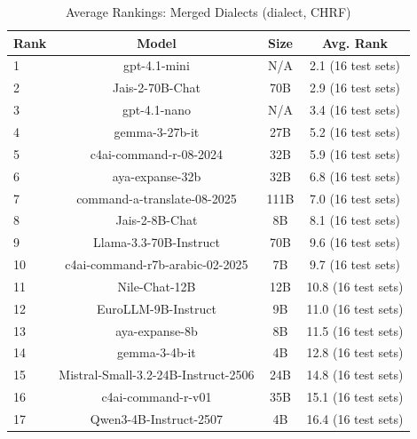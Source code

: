 \begin{table}[htbp]
\centering
\caption{Average Rankings: Merged Dialects (dialect, CHRF)}
\label{tab:avg_rankings_chrf_dialect}
\begin{tabular}{l@{\hspace{3pt}}c@{\hspace{3pt}}c@{\hspace{3pt}}c}
\toprule
Rank & Model & Size & Avg. Rank \\
\midrule
1 & gpt-4.1-mini & N/A & 2.1 (16 test sets) \\
2 & Jais-2-70B-Chat & 70B & 2.9 (16 test sets) \\
3 & gpt-4.1-nano & N/A & 3.4 (16 test sets) \\
4 & gemma-3-27b-it & 27B & 5.2 (16 test sets) \\
5 & c4ai-command-r-08-2024 & 32B & 5.9 (16 test sets) \\
6 & aya-expanse-32b & 32B & 6.8 (16 test sets) \\
7 & command-a-translate-08-2025 & 111B & 7.0 (16 test sets) \\
8 & Jais-2-8B-Chat & 8B & 8.1 (16 test sets) \\
9 & Llama-3.3-70B-Instruct & 70B & 9.6 (16 test sets) \\
10 & c4ai-command-r7b-arabic-02-2025 & 7B & 9.7 (16 test sets) \\
11 & Nile-Chat-12B & 12B & 10.8 (16 test sets) \\
12 & EuroLLM-9B-Instruct & 9B & 11.0 (16 test sets) \\
13 & aya-expanse-8b & 8B & 11.5 (16 test sets) \\
14 & gemma-3-4b-it & 4B & 12.8 (16 test sets) \\
15 & Mistral-Small-3.2-24B-Instruct-2506 & 24B & 14.8 (16 test sets) \\
16 & c4ai-command-r-v01 & 35B & 15.1 (16 test sets) \\
17 & Qwen3-4B-Instruct-2507 & 4B & 16.4 (16 test sets) \\
\bottomrule
\end{tabular}
\end{table}